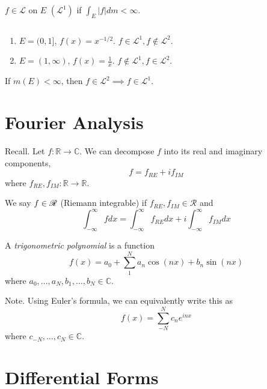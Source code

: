 \documentclass[11pt]{article}
\begin{document}
\begin{remark} $f \in \mathscr{L}$ on $E$ $(\mathscr{L}^1)$ if $\int_E |f| dm < \infty$.
\end{remark}

\begin{example} $\text{}$
  \begin{enumerate}
  \item $E = (0, 1]$, $f(x) = x^{-1/2}$. $f \in \mathscr{L}^1, f \notin \mathscr{L}^2$.
  \item $E = (1, \infty)$, $f(x) = \frac{1}{x}$. $f \notin \mathscr{L}^1, f \in \mathscr{L}^2$.
  \end{enumerate}
\end{example}

\begin{theorem} If $m(E) < \infty$, then $f \in \mathscr{L}^2 \implies f \in \mathscr{L}^1$.
\end{theorem}

\section{Fourier Analysis}

Recall. Let $f: \mathbb{R} \to \mathbb{C}$. We can decompose $f$ into its real and imaginary components, $$f = f_{RE} + i f_{IM}$$where $f_{RE}, f_{IM}: \mathbb{R} \to \mathbb{R}$.

We say $f \in \mathscr{R}$ (Riemann integrable) if $f_{RE}, f_{IM} \in \mathscr{R}$ and $$\int_{- \infty}^\infty f dx = \int_{- \infty}^\infty f_{RE} dx + i \int_{-\infty}^\infty f_{IM} dx$$

\begin{definition} A \emph{trigonometric polynomial} is a function $$f(x) = a_0 + \sum_1^N a_n \cos (nx) + b_n \sin (nx)$$ where $a_0, \dots, a_N, b_1, \dots, b_N \in \mathbb{C}$.
\end{definition}

Note. Using Euler's formula, we can equivalently write this as $$f(x) = \sum_{-N}^N c_n e^{inx}$$ where $c_{-N}, \dots, c_N \in \mathbb{C}$.

\section{Differential Forms}
  
\end{document}
